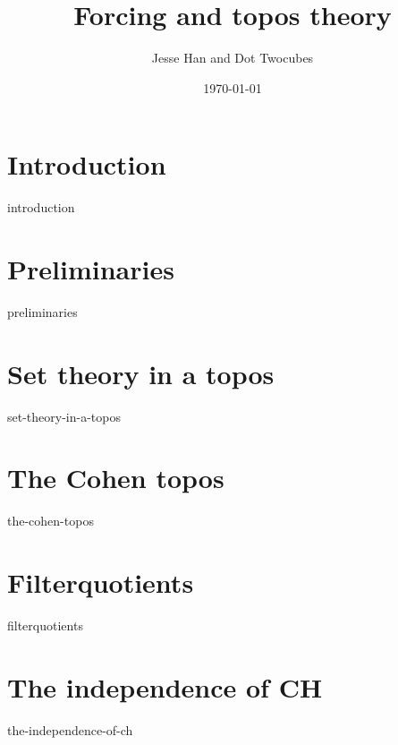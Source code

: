 \documentclass[12pt]{tufte-book}
\title{Forcing and topos theory}
\author{Jesse Han and Dot Twocubes}
\date{\today}
\begin{document}
 
\maketitle

    \tableofcontents
    
    \chapter{Introduction}
    {introduction}
 
    \chapter{Preliminaries}
    {preliminaries}

    \chapter{Set theory in a topos}
    {set-theory-in-a-topos}

    \chapter{The Cohen topos}
    {the-cohen-topos}

    \chapter{Filterquotients}
    {filterquotients}

    \chapter{The independence of CH}
    {the-independence-of-ch}
\end{document}
